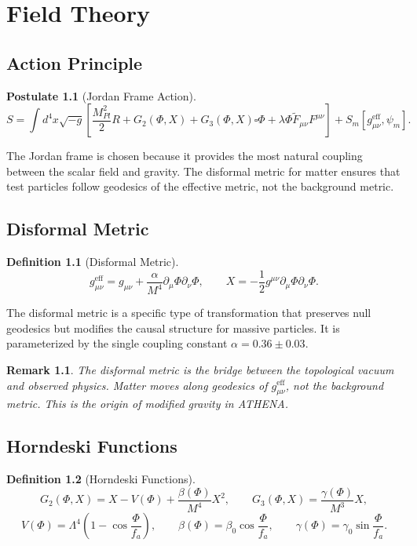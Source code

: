 \documentclass[12pt,oneside]{book}
\newtheorem{definition}{Definition}[chapter]
\newtheorem{postulate}{Postulate}[chapter]
\newtheorem{remark}{Remark}[chapter]
\begin{document}
\chapter{Field Theory}

\section{Action Principle}

\begin{postulate}[Jordan Frame Action]
\[
S = \int d^4x \sqrt{-g} \left[ \frac{M_{Pl}^2}{2} R + G_2(\Phi, X) + G_3(\Phi, X)\square\Phi + \lambda \Phi \tilde{F}_{\mu\nu} F^{\mu\nu} \right] + S_m[g_{\mu\nu}^{\text{eff}}, \psi_m].
\]
\end{postulate}

The Jordan frame is chosen because it provides the most natural coupling between the scalar field and gravity. The disformal metric for matter ensures that test particles follow geodesics of the effective metric, not the background metric.

\section{Disformal Metric}

\begin{definition}[Disformal Metric]
\[
g_{\mu\nu}^{\text{eff}} = g_{\mu\nu} + \frac{\alpha}{M^4} \partial_\mu\Phi \partial_\nu\Phi, \qquad X = -\frac{1}{2} g^{\mu\nu} \partial_\mu\Phi \partial_\nu\Phi.
\]
\end{definition}

The disformal metric is a specific type of transformation that preserves null geodesics but modifies the causal structure for massive particles. It is parameterized by the single coupling constant $\alpha = 0.36 \pm 0.03$.

\begin{remark}
The disformal metric is the bridge between the topological vacuum and observed physics. Matter moves along geodesics of $g_{\mu\nu}^{\text{eff}}$, not the background metric. This is the origin of modified gravity in ATHENA.
\end{remark}

\section{Horndeski Functions}

\begin{definition}[Horndeski Functions]
\[
G_2(\Phi, X) = X - V(\Phi) + \frac{\beta(\Phi)}{M^4} X^2, \qquad G_3(\Phi, X) = \frac{\gamma(\Phi)}{M^3} X,
\]
\[
V(\Phi) = \Lambda^4 \left(1 - \cos\frac{\Phi}{f_a}\right), \qquad \beta(\Phi) = \beta_0 \cos\frac{\Phi}{f_a}, \qquad \gamma(\Phi) = \gamma_0 \sin\frac{\Phi}{f_a}.
\]
\end{definition}
\end{document}
